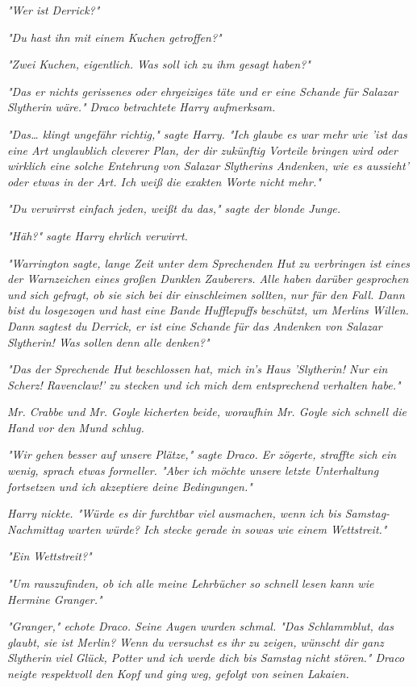 {\emph{"Wer ist Derrick?"}

\emph{"Du hast ihn mit einem Kuchen getroffen?"}

\emph{"Zwei Kuchen, eigentlich. Was soll ich zu ihm gesagt haben?"}

\emph{"Das er nichts gerissenes oder ehrgeiziges täte und er eine Schande für} \emph{Salazar Slytherin wäre." Draco betrachtete Harry aufmerksam.}

\emph{"Das… klingt ungefähr richtig," sagte Harry. "Ich glaube es war mehr wie 'ist das eine Art unglaublich cleverer Plan, der dir zukünftig Vorteile} \emph{bringen wird oder wirklich eine solche Entehrung von Salazar Slytherins Andenken, wie es aussieht' oder etwas in der Art. Ich weiß die exakten Worte nicht mehr."}

\emph{"Du verwirrst einfach jeden, weißt du das," sagte der blonde Junge.}

\emph{"Häh?" sagte Harry ehrlich verwirrt.}

\emph{"Warrington sagte, lange Zeit unter dem Sprechenden Hut zu verbringen ist eines der Warnzeichen eines großen Dunklen Zauberers. Alle haben darüber gesprochen und sich gefragt, ob sie sich bei dir einschleimen sollten, nur für den Fall. Dann bist du losgezogen und hast eine Bande} \emph{\emph{Hufflepuffs}} \emph{beschützt, um Merlins Willen.} \emph{\emph{Dann}} \emph{sagtest du Derrick, er ist eine Schande für das Andenken von Salazar Slytherin! Was} \emph{\emph{sollen}} \emph{denn alle denken?"}

\emph{"Das der Sprechende Hut beschlossen hat, mich in's Haus 'Slytherin! Nur ein Scherz! Ravenclaw!' zu stecken und ich mich dem entsprechend verhalten habe."}

\emph{Mr. Crabbe und Mr. Goyle kicherten beide, woraufhin Mr. Goyle sich schnell die Hand vor den Mund schlug.}

\emph{"Wir gehen besser auf unsere Plätze," sagte Draco. Er zögerte, straffte sich ein wenig, sprach etwas formeller. "Aber ich möchte unsere letzte Unterhaltung fortsetzen und ich akzeptiere deine Bedingungen."}

\emph{Harry nickte. "Würde es dir furchtbar viel ausmachen, wenn ich bis Samstag-Nachmittag warten würde? Ich stecke gerade in sowas wie einem Wettstreit."}

\emph{"Ein Wettstreit?"}

\emph{"Um rauszufinden, ob ich alle meine Lehrbücher so schnell lesen kann wie Hermine Granger."}

\emph{"Granger," echote Draco. Seine Augen wurden schmal. "Das Schlammblut, das glaubt, sie ist Merlin? Wenn du versuchst es} \emph{\emph{ihr}} \emph{zu zeigen, wünscht dir ganz Slytherin} \emph{\emph{viel}} \emph{Glück, Potter und ich werde dich bis Samstag nicht stören." Draco neigte respektvoll den Kopf und ging weg, gefolgt von seinen Lakaien.}

}
